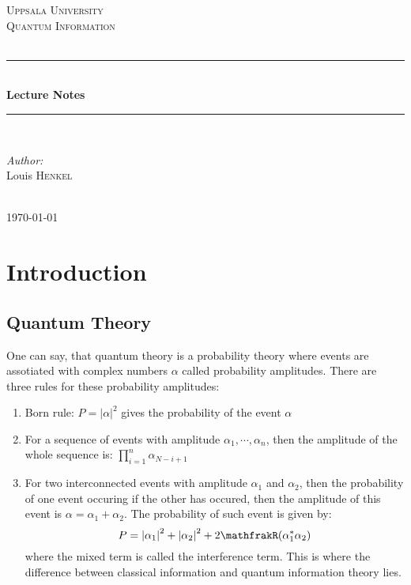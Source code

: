 \documentclass[12pt]{book}
\theoremstyle{definition}
\newcommand{\abs}[1]{\left\vert {#1}\right\vert}
\let\Re\mathfrakR
\DeclareMathOperator{\Re}{Re}
\begin{document}
\begin{titlepage}

\newcommand{\HRule}{\rule{\linewidth}{0.5mm}}
\center

\textsc{\LARGE Uppsala University}\\[1.5cm]
\textsc{\Large Quantum Information}\\[0.5cm]
\textsc{\large }\\[0.5cm]


\HRule \\[0.4cm]
{\huge \bfseries Lecture Notes}\\[0.4cm]
\HRule \\[1.5cm]

\begin{minipage}{0.4\textwidth}
\begin{flushleft} \large
\emph{Author:}\\
Louis \textsc{Henkel}\\
\end{flushleft}

\end{minipage}\\[2cm]


{\large \today}\\[2cm]
\vfill

\end{titlepage}
\tableofcontents


\chapter{Introduction}
\section*{Quantum Theory}

One can say, that quantum theory is a probability theory where events are assotiated with complex numbers $\alpha$ called probability amplitudes. There are three rules for these probability amplitudes:
\begin{enumerate}[label = (\alph*)]
  \item Born rule: $P = \abs{\alpha}^2$ gives the probability of the event $\alpha$
  \item For a sequence of events with amplitude $\alpha_1, \cdots, \alpha_n$, then the amplitude of the whole sequence is: $\prod\limits_{i=1}^{n} \alpha_{N-i+1}$
  \item For two interconnected events with amplitude $\alpha_1$ and $\alpha_2$, then the probability of one event occuring if the other has occured, then the amplitude of this event is $\alpha = \alpha_1 + \alpha_2$. The probability of such event is given by:
  \begin{equation}
    P = \abs{\alpha_1}^2 + \abs{\alpha_2}^2 + 2 \Re(\alpha_1^*\alpha_2)
  \end{equation}
  where the mixed term is called the interference term. This is where the difference between classical information and quantum information theory lies.
\end{enumerate}
\end{document}
